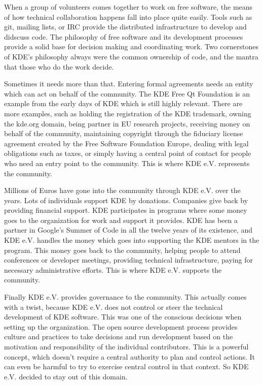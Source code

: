 When a group of volunteers comes together to work on free software, the means of how technical collaboration happens fall into place quite easily. Tools such as git, mailing lists, or IRC provide the distributed infrastructure to develop and didscuss code. The philosophy of free software and its development processes provide a solid base for decision making and coordinating work. Two cornerstones of KDE's philosophy always were the common ownership of code, and the mantra that those who do the work decide.

Sometimes it needs more than that. Entering formal agreements needs an entity which can act on behalf of the community. The KDE Free Qt Foundation is an example from the early days of KDE which is still highly relevant. There are more examples, such as holding the registration of the KDE trademark, owning the kde.org domain, being partner in EU research projects, receiving money on behalf of the community, maintaining copyright through the fiduciary license agreement created by the Free Software Foundation Europe, dealing with legal obligations such as taxes, or simply having a central point of contact for people who need an entry point to the community. This is where KDE e.V. represents the community.

Millions of Euros have gone into the community through KDE e.V. over the years. Lots of individuals support KDE by donations. Companies give back by providing financial support. KDE participates in programs where some money goes to the organization for work and support it provides. KDE has been a partner in Google's Summer of Code in all the twelve years of its existence, and KDE e.V. handles the money which goes into supporting the KDE mentors in the program. This money goes back to the community, helping people to attend conferences or developer meetings, providing technical infrastructure, paying for necessary administrative efforts. This is where KDE e.V. supports the community.

Finally KDE e.V. provides governance to the community. This actually comes with a twist, because KDE e.V. does not control or steer the technical development of KDE software. This was one of the conscious decisions when setting up the organization. The open source development process provides culture and practices to take decisions and run development based on the motivation and responsibility of the individual contributors. This is a powerful concept, which doesn't require a central authority to plan and control actions. It can even be harmful to try to exercise central control in that context. So KDE e.V. decided to stay out of this domain.

